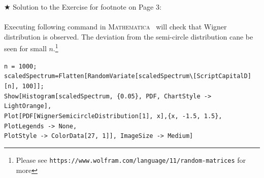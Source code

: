 \documentclass[letter,11pt]{article}
\newcommand{\MA}{\textsc{Mathematica}}
\begin{document}
\noindent $\bigstar$ Solution to the Exercise for footnote on Page 3:
\\  \\
Executing following command in \MA~ will check that Wigner distribution is 
observed. The deviation from the semi-circle distribution cane be seen for small 
$n$.\footnote{Please see \texttt{https://www.wolfram.com/language/11/random-matrices} for more}
\vspace{3mm} 
\begin{mdframed}[backgroundcolor=magenta!3]
	\begin{footnotesize} 
		\verb"n = 1000;"\\ 
		\verb"scaledSpectrum=Flatten[RandomVariate[scaledSpectrum\[ScriptCapitalD][n], 100]];"\\
		\verb"Show[Histogram[scaledSpectrum, {0.05}, PDF, ChartStyle -> LightOrange], "  \\ 
		\verb"Plot[PDF[WignerSemicircleDistribution[1], x],{x, -1.5, 1.5}, PlotLegends -> None, " \\
		\verb"PlotStyle -> ColorData[27, 1]], ImageSize -> Medium]"
	\end{footnotesize} 
\end{mdframed} 



\end{document}
